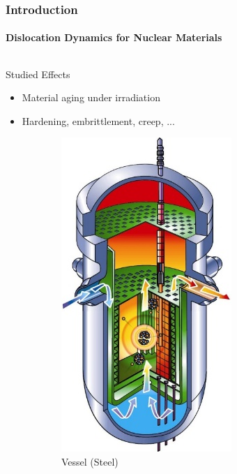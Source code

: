 \documentclass[aspectratio=1610,t,10pt]{beamer}
\newlength{\freeheight}
\begin{document}
\begin{frame}
    \frametitle{Introduction}
    \framesubtitle{Dislocation Dynamics for Nuclear Materials}
    \begin{columns}[c]
	    \begin{column}{.48\textwidth}
	        
	        	\begin{block}{Studied Effects}
	        		\begin{itemize}
	        			\item Material aging under irradiation
	        			\item Hardening, embrittlement, creep, ...
	        		\end{itemize}
	        	\end{block}
	       
	        \begin{figure}
	            \centering
	            \begin{subfigure}[t]{0.38\textwidth}
	                \centering
	                \includegraphics[height=0.5\freeheight, keepaspectratio]{img/vessel}
	                \caption{Vessel (Steel) }
	            \end{subfigure}
	            \begin{subfigure}[t]{0.58\textwidth}
	                \centering

\end{subfigure}
\end{figure}
\end{column}
\end{columns}
\end{frame}
\end{document}
